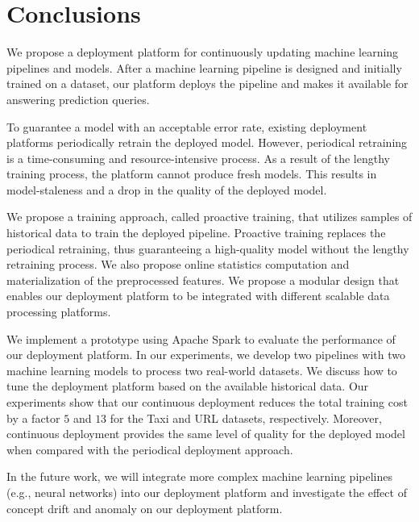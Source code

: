 \section{Conclusions} \label{conclusion}
We propose a deployment platform for continuously updating machine learning pipelines and models.
After a machine learning pipeline is designed and initially trained on a dataset, our platform deploys the pipeline and makes it available for answering prediction queries.

To guarantee a model with an acceptable error rate, existing deployment platforms periodically retrain the deployed model. 
However, periodical retraining is a time-consuming and resource-intensive process.
As a result of the lengthy training process, the platform cannot produce fresh models.
This results in model-staleness and a drop in the quality of the deployed model.

We propose a training approach, called proactive training, that utilizes samples of historical data to train the deployed pipeline.
Proactive training replaces the periodical retraining, thus guaranteeing a high-quality model without the lengthy retraining process.
We also propose online statistics computation and materialization of the preprocessed features.
We propose a modular design that enables our deployment platform to be integrated with different scalable data processing platforms.

We implement a prototype using Apache Spark to evaluate the performance of our deployment platform.
In our experiments, we develop two pipelines with two machine learning models to process two real-world datasets.
We discuss how to tune the deployment platform based on the available historical data.
Our experiments show that our continuous deployment reduces the total training cost by a factor $5$ and $13$ for the Taxi and URL datasets, respectively.
Moreover, continuous deployment provides the same level of quality for the deployed model when compared with the periodical deployment approach.

In the future work, we will integrate more complex machine learning pipelines (e.g., neural networks) into our deployment platform and investigate the effect of concept drift and anomaly on our deployment platform.

